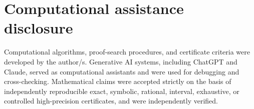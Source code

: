 \documentclass[11pt]{article}
\numberwithin{equation}{section}
\begin{document}
\section*{Computational assistance disclosure}
Computational algorithms, proof-search procedures, and certificate criteria were developed by the author/s. Generative AI systems, including ChatGPT and Claude, served as computational assistants and were used for debugging and cross-checking. Mathematical claims were accepted strictly on the basis of independently reproducible exact, symbolic, rational, interval, exhaustive, or controlled high-precision certificates, and were independently verified.

\printbibliography[title={References}]
\end{document}

